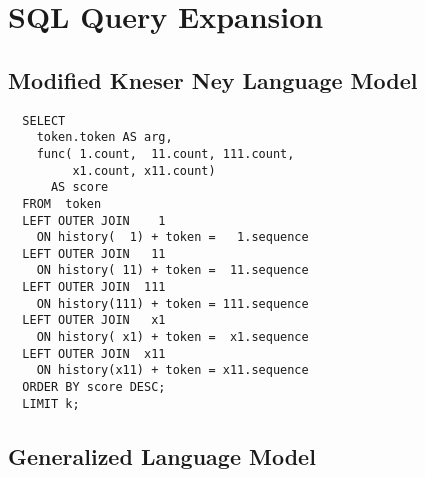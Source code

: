 \begin{landscape}
\begin{figure}[H]
{
    }
  \end{figure}
\end{landscape}

\clearpage
\section{SQL Query Expansion}


\subsection{Modified Kneser Ney Language Model}

\begin{lstlisting}
  SELECT
    token.token AS arg,
    func( 1.count,  11.count, 111.count,
         x1.count, x11.count)
      AS score
  FROM  token
  LEFT OUTER JOIN    1
    ON history(  1) + token =   1.sequence
  LEFT OUTER JOIN   11
    ON history( 11) + token =  11.sequence
  LEFT OUTER JOIN  111
    ON history(111) + token = 111.sequence
  LEFT OUTER JOIN   x1
    ON history( x1) + token =  x1.sequence
  LEFT OUTER JOIN  x11
    ON history(x11) + token = x11.sequence
  ORDER BY score DESC;
  LIMIT k;
\end{lstlisting}

\subsection{Generalized Language Model}

